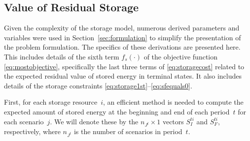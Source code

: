 \documentclass[12pt]{article}
\numberwithin{equation}{section}
\numberwithin{table}{section}
\numberwithin{figure}{section}
\begin{document}
% 

\clearpage
\subsection{Value of Residual Storage}
\label{sec:residualstorage}

Given the complexity of the storage model, numerous derived parameters and variables were used in Section~\ref{sec:formulation} to simplify the presentation of the problem formulation. The specifics of these derivations are presented here. This includes details of the sixth term $f_s(\cdot)$ of the objective function \eqref{eq:mostobjective}, specifically the last three terms of \eqref{eq:storagecost} related to the expected residual value of stored energy in terminal states. It also includes details of the storage constraints \eqref{eq:storage1st}--\eqref{eq:sfequals0}.

First, for each storage resource~$i$, an efficient method is needed to compute the expected amount of stored energy at the beginning and end of each period~$t$ for each scenario~$j$. We will denote these by the $n_{J^t} \times 1$ vectors $S_I^{ti}$ and $S_F^{ti}$, respectively, where $n_{J^t}$ is the number of scenarios in period~$t$.
\end{document}
